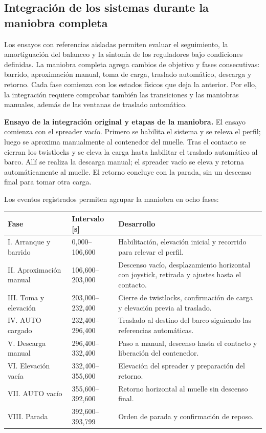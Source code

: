 \documentclass[a4paper,10pt,onecolumn,journal]{ieeeconf}
\numberwithin{equation}{section}
\begin{document}
\subsection{Integración de los sistemas durante la maniobra completa}
Los ensayos con referencias aisladas permiten evaluar el seguimiento, la amortiguación del balanceo y la sintonía de los reguladores bajo condiciones definidas. La maniobra completa agrega cambios de objetivo y fases consecutivas: barrido, aproximación manual, toma de carga, traslado automático, descarga y retorno. Cada fase comienza con los estados físicos que deja la anterior. Por ello, la integración requiere comprobar también las transiciones y las maniobras manuales, además de las ventanas de traslado automático.

\textbf{Ensayo de la integración original y etapas de la maniobra.} El ensayo comienza con el spreader vacío. Primero se habilita el sistema y se releva el perfil; luego se aproxima manualmente al contenedor del muelle. Tras el contacto se cierran los twistlocks y se eleva la carga hasta habilitar el traslado automático al barco. Allí se realiza la descarga manual; el spreader vacío se eleva y retorna automáticamente al muelle. El retorno concluye con la parada, sin un descenso final para tomar otra carga.

Los eventos registrados permiten agrupar la maniobra en ocho fases:

\begin{table}[H]
\centering
{\small
\begin{tabular}{@{}L{0.25\textwidth}L{0.22\textwidth}L{0.45\textwidth}@{}}
\toprule
Fase & Intervalo [s] & Desarrollo\\
\midrule
I. Arranque y barrido & 0,000--106,600 & Habilitación, elevación inicial y recorrido para relevar el perfil.\\
II. Aproximación manual & 106,600--203,000 & Descenso vacío, desplazamiento horizontal con joystick, retirada y ajustes hasta el contacto.\\
III. Toma y elevación & 203,000--232,400 & Cierre de twistlocks, confirmación de carga y elevación previa al traslado.\\
IV. AUTO cargado & 232,400--296,400 & Traslado al destino del barco siguiendo las referencias automáticas.\\
V. Descarga manual & 296,400--332,400 & Paso a manual, descenso hasta el contacto y liberación del contenedor.\\
VI. Elevación vacía & 332,400--355,600 & Elevación del spreader y preparación del retorno.\\
VII. AUTO vacío & 355,600--392,600 & Retorno horizontal al muelle sin descenso final.\\
VIII. Parada & 392,600--393,799 & Orden de parada y confirmación de reposo.\\
\bottomrule
\end{tabular}
}
\end{table}
\end{document}
